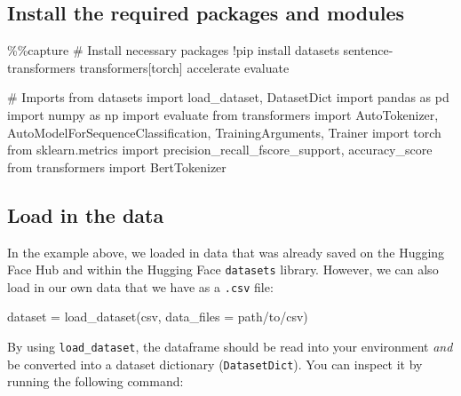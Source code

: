 \documentclass[
  letterpaper,
  DIV=11,
  numbers=noendperiod]{scrreprt}
\newenvironment{Shaded}{\begin{snugshade}}{\end{snugshade}}
\newcommand{\CommentTok}[1]{\textcolor[rgb]{0.37,0.37,0.37}{#1}}
\newcommand{\ImportTok}[1]{\textcolor[rgb]{0.00,0.46,0.62}{#1}}
\newcommand{\NormalTok}[1]{\textcolor[rgb]{0.00,0.23,0.31}{#1}}
\newcommand{\OperatorTok}[1]{\textcolor[rgb]{0.37,0.37,0.37}{#1}}
\newcommand{\StringTok}[1]{\textcolor[rgb]{0.13,0.47,0.30}{#1}}
\begin{document}
\subsection{Install the required packages and
modules}\label{install-the-required-packages-and-modules-1}

\begin{Shaded}
\begin{Highlighting}[]
\OperatorTok{\%\%}\NormalTok{capture}
\CommentTok{\# Install  necessary packages}
\OperatorTok{!}\NormalTok{pip install datasets sentence}\OperatorTok{{-}}\NormalTok{transformers transformers[torch] accelerate evaluate}

\CommentTok{\# Imports }
\ImportTok{from}\NormalTok{ datasets }\ImportTok{import}\NormalTok{ load\_dataset, DatasetDict}
\ImportTok{import}\NormalTok{ pandas }\ImportTok{as}\NormalTok{ pd}
\ImportTok{import}\NormalTok{ numpy }\ImportTok{as}\NormalTok{ np}
\ImportTok{import}\NormalTok{ evaluate}
\ImportTok{from}\NormalTok{ transformers }\ImportTok{import}\NormalTok{ AutoTokenizer, AutoModelForSequenceClassification, TrainingArguments, Trainer}
\ImportTok{import}\NormalTok{ torch}
\ImportTok{from}\NormalTok{ sklearn.metrics }\ImportTok{import}\NormalTok{ precision\_recall\_fscore\_support, accuracy\_score}
\ImportTok{from}\NormalTok{ transformers }\ImportTok{import}\NormalTok{ BertTokenizer}
\end{Highlighting}
\end{Shaded}

\subsection{Load in the data}\label{load-in-the-data-1}

In the example above, we loaded in data that was already saved on the
Hugging Face Hub and within the Hugging Face \texttt{datasets} library.
However, we can also load in our own data that we have as a
\texttt{.csv} file:

\begin{Shaded}
\begin{Highlighting}[]
\NormalTok{dataset }\OperatorTok{=}\NormalTok{ load\_dataset(}\StringTok{\textquotesingle{}csv\textquotesingle{}}\NormalTok{, data\_files }\OperatorTok{=}\NormalTok{ path}\OperatorTok{/}\NormalTok{to}\OperatorTok{/}\NormalTok{csv)}
\end{Highlighting}
\end{Shaded}

By using \texttt{load\_dataset}, the dataframe should be read into your
environment \emph{and} be converted into a dataset dictionary
(\texttt{DatasetDict}). You can inspect it by running the following
command:
\end{document}
